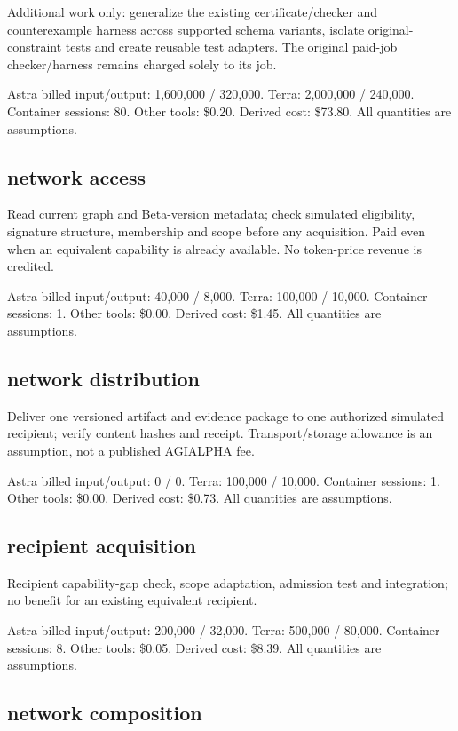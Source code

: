 \documentclass[10pt]{article}
\newcommand{\usd}[1]{\$#1}
\begin{document}
Additional work only: generalize the existing certificate/checker and counterexample harness across supported schema variants, isolate original-constraint tests and create reusable test adapters. The original paid-job checker/harness remains charged solely to its job.

Astra billed input/output: 1,600,000 / 320,000. Terra: 2,000,000 / 240,000. Container sessions: 80. Other tools: \usd{0.20}. Derived cost: \usd{73.80}. All quantities are assumptions.

\subsection*{network access}

Read current graph and Beta-version metadata; check simulated eligibility, signature structure, membership and scope before any acquisition. Paid even when an equivalent capability is already available. No token-price revenue is credited.

Astra billed input/output: 40,000 / 8,000. Terra: 100,000 / 10,000. Container sessions: 1. Other tools: \usd{0.00}. Derived cost: \usd{1.45}. All quantities are assumptions.

\subsection*{network distribution}

Deliver one versioned artifact and evidence package to one authorized simulated recipient; verify content hashes and receipt. Transport/storage allowance is an assumption, not a published AGIALPHA fee.

Astra billed input/output: 0 / 0. Terra: 100,000 / 10,000. Container sessions: 1. Other tools: \usd{0.00}. Derived cost: \usd{0.73}. All quantities are assumptions.

\subsection*{recipient acquisition}

Recipient capability-gap check, scope adaptation, admission test and integration; no benefit for an existing equivalent recipient.

Astra billed input/output: 200,000 / 32,000. Terra: 500,000 / 80,000. Container sessions: 8. Other tools: \usd{0.05}. Derived cost: \usd{8.39}. All quantities are assumptions.

\subsection*{network composition}
\end{document}
